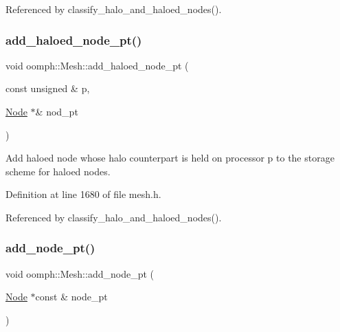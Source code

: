 Referenced by classify\+\_\+halo\+\_\+and\+\_\+haloed\+\_\+nodes().

\mbox{\label{classoomph_1_1Mesh_abd2b195d6bdf05acff222d2ae1c68357}} 
\subsubsection{\texorpdfstring{add\+\_\+haloed\+\_\+node\+\_\+pt()}{add\_haloed\_node\_pt()}}
{\footnotesize\ttfamily void oomph\+::\+Mesh\+::add\+\_\+haloed\+\_\+node\+\_\+pt (\begin{DoxyParamCaption}\item[{const unsigned \&}]{p,  }\item[{\hyperlink{classoomph_1_1Node}{Node} $\ast$\&}]{nod\+\_\+pt }\end{DoxyParamCaption})\hspace{0.3cm}{\ttfamily [inline]}}



Add haloed node whose halo counterpart is held on processor p to the storage scheme for haloed nodes. 



Definition at line 1680 of file mesh.\+h.



Referenced by classify\+\_\+halo\+\_\+and\+\_\+haloed\+\_\+nodes().

\mbox{\label{classoomph_1_1Mesh_ac09a9bfeb6d70d8bbefe13c86948a6fc}} 
\subsubsection{\texorpdfstring{add\+\_\+node\+\_\+pt()}{add\_node\_pt()}}
{\footnotesize\ttfamily void oomph\+::\+Mesh\+::add\+\_\+node\+\_\+pt (\begin{DoxyParamCaption}\item[{\hyperlink{classoomph_1_1Node}{Node} $\ast$const \&}]{node\+\_\+pt }\end{DoxyParamCaption})\hspace{0.3cm}{\ttfamily [inline]}}



